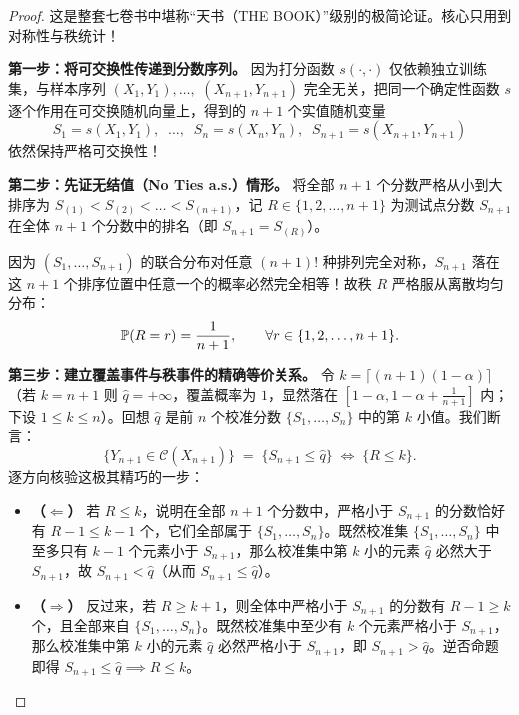 \begin{proof}
这是整套七卷书中堪称“天书（THE BOOK）”级别的极简论证。核心只用到对称性与秩统计！

\textbf{第一步：将可交换性传递到分数序列。}
因为打分函数 $s(\cdot,\cdot)$ 仅依赖独立训练集，与样本序列 $(X_1,Y_1),\dots,$ $(X_{n+1},Y_{n+1})$ 完全无关，把同一个确定性函数 $s$ 逐个作用在可交换随机向量上，得到的 $n+1$ 个实值随机变量
\[
  S_1 = s(X_1,Y_1),\;\; \dots,\;\; S_n = s(X_n,Y_n),\;\; S_{n+1} = s(X_{n+1},Y_{n+1})
\]
依然保持严格可交换性！

\textbf{第二步：先证无结值（No Ties a.s.）情形。}
将全部 $n+1$ 个分数严格从小到大排序为 $S_{(1)} < S_{(2)} < \dots < S_{(n+1)}$，记 $R \in \{1,2,\dots,n+1\}$ 为测试点分数 $S_{n+1}$ 在全体 $n+1$ 个分数中的排名（即 $S_{n+1} = S_{(R)}$）。

因为 $(S_1,\dots,S_{n+1})$ 的联合分布对任意 $(n+1)!$ 种排列完全对称，$S_{n+1}$ 落在这 $n+1$ 个排序位置中任意一个的概率必然完全相等！故秩 $R$ 严格服从离散均匀分布：
\begin{equation}\label{eq:rank-uniform}
  \mathbb{P}(R = r) = \frac{1}{n+1}, \qquad \forall r \in \{1,2,\dots,n+1\}.
\end{equation}

\textbf{第三步：建立覆盖事件与秩事件的精确等价关系。}
令 $k = \lceil (n+1)(1-\alpha) \rceil$（若 $k = n+1$ 则 $\hat{q} = +\infty$，覆盖概率为 $1$，显然落在 $[1-\alpha, 1-\alpha+\frac{1}{n+1}]$ 内；下设 $1 \le k \le n$）。回想 $\hat{q}$ 是前 $n$ 个校准分数 $\{S_1,\dots,S_n\}$ 中的第 $k$ 小值。我们断言：
\begin{equation}\label{eq:equiv-event}
  \big\{Y_{n+1} \in \mathcal{C}(X_{n+1})\big\}
  \;=\; \big\{S_{n+1} \le \hat{q}\big\}
  \;\Longleftrightarrow\; \big\{R \le k\big\}.
\end{equation}
逐方向核验这极其精巧的一步：
\begin{itemize}
  \item \textbf{（$\Leftarrow$）} 若 $R \le k$，说明在全部 $n+1$ 个分数中，严格小于 $S_{n+1}$ 的分数恰好有 $R-1 \le k-1$ 个，它们全部属于 $\{S_1,\dots,S_n\}$。既然校准集 $\{S_1,\dots,S_n\}$ 中至多只有 $k-1$ 个元素小于 $S_{n+1}$，那么校准集中第 $k$ 小的元素 $\hat{q}$ 必然大于 $S_{n+1}$，故 $S_{n+1} < \hat{q}$（从而 $S_{n+1} \le \hat{q}$）。
  \item \textbf{（$\Rightarrow$）} 反过来，若 $R \ge k+1$，则全体中严格小于 $S_{n+1}$ 的分数有 $R-1 \ge k$ 个，且全部来自 $\{S_1,\dots,S_n\}$。既然校准集中至少有 $k$ 个元素严格小于 $S_{n+1}$，那么校准集中第 $k$ 小的元素 $\hat{q}$ 必然严格小于 $S_{n+1}$，即 $S_{n+1} > \hat{q}$。逆否命题即得 $S_{n+1} \le \hat{q} \implies R \le k$。
\end{itemize}


\end{proof}
